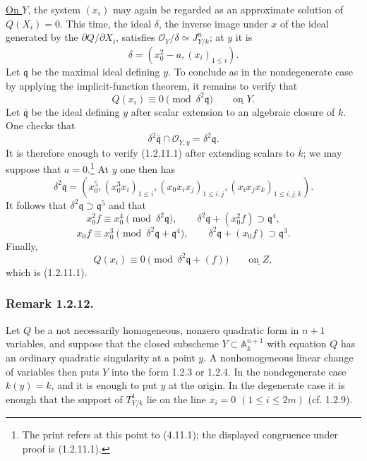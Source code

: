 \underline{On $Y$}, the system $(x_i)$ may again be regarded as an
approximate solution of $Q(X_i)=0$.  This time, the ideal $\delta$,
the inverse image under $x$ of the ideal generated by the
$\partial Q/\partial X_i$, satisfies
$\mathcal O_Y/\delta\simeq J^n_{Y/k}$; at $y$ it is
\[
\delta=(x_0^2-a,(x_i)_{1\leq i}).
\]
Let $\mathfrak q$ be the maximal ideal defining $y$.  To conclude as
in the nondegenerate case by applying the implicit-function theorem,
it remains to verify that
\begin{equation}\tag{1.2.11.1}
Q(x_i)\equiv0\pmod{\delta^2\mathfrak q}
\qquad\underline{\text{on }Y}.
\end{equation}
Let $\bar{\mathfrak q}$ be the ideal defining $y$ after scalar
extension to an algebraic closure of $k$.  One checks that
\[
\delta^2\bar{\mathfrak q}\cap\mathcal O_{Y,y}
=\delta^2\mathfrak q.
\]
It is therefore enough to verify (1.2.11.1) after extending scalars
to $\bar k$; we may suppose that $a=0$.\footnote{The print refers at
this point to (4.11.1); the displayed congruence under proof is
(1.2.11.1).}
At $y$ one then has
\[
\delta^2\mathfrak q=
(x_0^5,(x_0^3x_i)_{1\leq i},
 (x_0x_ix_j)_{1\leq i,j},
 (x_ix_jx_k)_{1\leq i,j,k}).
\]
It follows that $\delta^2\mathfrak q\supset\mathfrak q^5$ and that
\[
x_0^2f\equiv x_0^4\pmod{\delta^2\mathfrak q},
\qquad
\delta^2\mathfrak q+(x_0^2f)\supset\mathfrak q^4,
\]
\[
x_0f\equiv x_0^3
 \pmod{\delta^2\mathfrak q+\mathfrak q^4},
\qquad
\delta^2\mathfrak q+(x_0f)\supset\mathfrak q^3.
\]
Finally,
\[
Q(x_i)\equiv0\pmod{\delta^2\mathfrak q+(f)}
\qquad\underline{\text{on }Z},
\]
which is (1.2.11.1).

\subsubsection*{Remark 1.2.12.}
Let $Q$ be a not necessarily homogeneous, nonzero quadratic form in
$n+1$ variables, and suppose that the closed subscheme
$Y\subset\mathbb A_k^{n+1}$ with equation $Q$ has an ordinary
quadratic singularity at a point $y$.  A nonhomogeneous linear change
of variables then puts $Y$ into the form 1.2.3 or 1.2.4.  In the
nondegenerate case $k(y)=k$, and it is enough to put $y$ at the
origin.  In the degenerate case it is enough that the support of
$T^1_{Y/k}$ lie on the line $x_i=0$ $(1\leq i\leq2m)$
(cf. 1.2.9).
